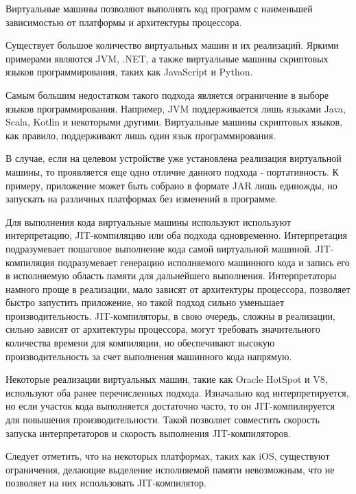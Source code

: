 Виртуальные машины позволяют выполнять код программ с наименьшей зависимостью от платформы и архитектуры процессора.

Существует большое количество виртуальных машин и их реализаций.
Яркими примерами являются JVM, .NET, а также виртуальные машины скриптовых языков программирования, таких как JavaScript и Python.

Самым большим недостатком такого подхода является ограничение в выборе языков программирования. 
Например, JVM поддерживается лишь языками Java, Scala, Kotlin и некоторыми другими. 
Виртуальные машины скриптовых языков, как правило, поддерживают лишь один язык программирования.

В случае, если на целевом устройстве уже установлена реализация виртуальной машины, то проявляется еще одно отличие данного подхода - портативность. 
К примеру, приложение может быть собрано в формате JAR лишь единожды, но запускать на различных платформах без изменений в программе.

Для выполнения кода виртуальные машины используют используют интерпретацию, JIT-компиляцию или оба подхода одновременно.
Интерпретация подразумевает пошаговое выполнение кода самой виртуальной машиной.
JIT-компиляция подразумевает генерацию исполняемого машинного кода и запись его в исполняемую область памяти для дальнейшего выполнения.
Интерпретаторы намного проще в реализации, мало зависят от архитектуры процессора, позволяет быстро запустить приложение, но такой подход сильно уменьшает производительность.
JIT-компиляторы, в свою очередь, сложны в реализации, сильно зависят от архитектуры процессора, могут требовать значительного количества времени для компиляции, но обеспечивают высокую производительность за счет выполнения машинного кода напрямую.

Некоторые реализации виртуальных машин, такие как Oracle HotSpot и V8, используют оба  ранее перечисленных подхода. 
Изначально код интерпретируется, но если участок кода выполняется достаточно часто, то он JIT-компилируется для повышения производительности. 
Такой позволяет совместить скорость запуска интерпретаторов и скорость выполнения JIT-компиляторов.

Следует отметить, что на некоторых платформах, таких как iOS, существуют ограничения, делающие выделение исполняемой памяти невозможным, что не позволяет на них использовать JIT-компилятор.
